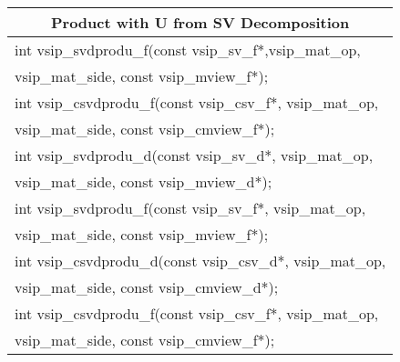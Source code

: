 %
\newline \hspace*{0.4cm} {
\ttfamily\vspace{.3cm}
\begin{tabular}[H]{|l|}
\multicolumn{1}{c}{\rmfamily \bfseries Product with U from SV Decomposition\vspace{.1cm}}\\ \hline
int vsip\_svdprodu\_f(const vsip\_sv\_f*,vsip\_mat\_op,\\*\hspace*{.8cm}vsip\_mat\_side, const vsip\_mview\_f*);\\
int vsip\_csvdprodu\_f(const vsip\_csv\_f*, vsip\_mat\_op,\\*\hspace*{.8cm}vsip\_mat\_side, const vsip\_cmview\_f*);\\
int vsip\_svdprodu\_d(const vsip\_sv\_d*, vsip\_mat\_op,\\*\hspace*{.8cm}vsip\_mat\_side, const vsip\_mview\_d*);\\
int vsip\_svdprodu\_f(const vsip\_sv\_f*, vsip\_mat\_op,\\*\hspace*{.8cm}vsip\_mat\_side, const vsip\_mview\_f*);\\
int vsip\_csvdprodu\_d(const vsip\_csv\_d*, vsip\_mat\_op,\\*\hspace*{.8cm}vsip\_mat\_side, const vsip\_cmview\_d*);\\
int vsip\_csvdprodu\_f(const vsip\_csv\_f*, vsip\_mat\_op,\\*\hspace*{.8cm}vsip\_mat\_side, const vsip\_cmview\_f*);\\
\hline\end{tabular}\\}
%
